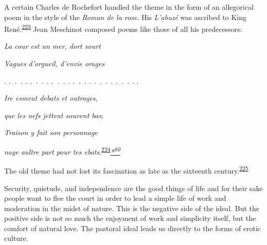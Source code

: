 A certain Charles de Rochefort handled the theme in the form of an
allegorical poem in the style of the \emph{Roman de la rose}. His
\emph{L'abuzé} was ascribed to King
René.\textsuperscript{\protect\hypertarget{10_Chapter_Three__THE_HEROIC_DREAM.xhtmlux5cux23id_1491}{\protect\hyperlink{23_NOTES.xhtmlux5cux23id_1492}{223}}}
Jean Meschinot composed poems like those of all his predecessors:

\emph{La cour est un mer, dort sourt}

\emph{Vagues d'orgueil, d'envie orages}

. \emph{.~.~. . .~.~. . .~.~. . .~.~. . .~.~. . .~.~. .} .

\emph{Ire esmeut debats et outrages},

\emph{que les nefs jettent souvent bas};

\emph{\protect\hypertarget{10_Chapter_Three__THE_HEROIC_DREAM.xhtmlux5cux23page_125}{}{}Traison
y fait son personnage}

\emph{nage aultre part pour tes
ebats}.\textsuperscript{\protect\hypertarget{10_Chapter_Three__THE_HEROIC_DREAM.xhtmlux5cux23id_1490}{\protect\hyperlink{23_NOTES.xhtmlux5cux23page_412}{224}}}\emph{\protect\hypertarget{10_Chapter_Three__THE_HEROIC_DREAM.xhtmlux5cux23id_3099}{\protect\hyperlink{23_NOTES.xhtmlux5cux23id_3100}{*\textsuperscript{80}}}}

The old theme had not lost its fascination as late as the sixteenth
century.\textsuperscript{\protect\hypertarget{10_Chapter_Three__THE_HEROIC_DREAM.xhtmlux5cux23id_1488}{\protect\hyperlink{23_NOTES.xhtmlux5cux23id_1489}{225}}}

Security, quietude, and independence are the good things of life and for
their sake people want to flee the court in order to lead a simple life
of work and moderation in the midst of nature. This is the negative side
of the ideal. But the positive side is not so much the enjoyment of work
and simplicity itself, but the comfort of natural love. The pastoral
ideal leads us directly to the forms of erotic culture.
